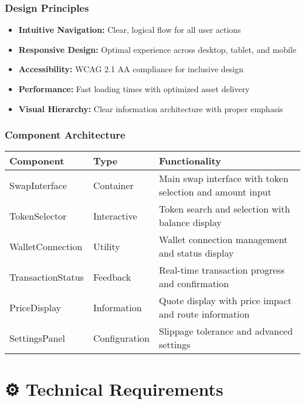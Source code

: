 \documentclass[12pt,a4paper]{article}
\begin{document}
\subsubsection{Design Principles}

\begin{itemize}
    \item \textbf{Intuitive Navigation:} Clear, logical flow for all user actions
    \item \textbf{Responsive Design:} Optimal experience across desktop, tablet, and mobile
    \item \textbf{Accessibility:} WCAG 2.1 AA compliance for inclusive design
    \item \textbf{Performance:} Fast loading times with optimized asset delivery
    \item \textbf{Visual Hierarchy:} Clear information architecture with proper emphasis
\end{itemize}

\subsubsection{Component Architecture}

\begin{longtable}{|p{4cm}|p{3cm}|p{6cm}|}
\hline
\textbf{Component} & \textbf{Type} & \textbf{Functionality} \\
\hline
\endhead

SwapInterface & Container & Main swap interface with token selection and amount input \\
\hline
TokenSelector & Interactive & Token search and selection with balance display \\
\hline
WalletConnection & Utility & Wallet connection management and status display \\
\hline
TransactionStatus & Feedback & Real-time transaction progress and confirmation \\
\hline
PriceDisplay & Information & Quote display with price impact and route information \\
\hline
SettingsPanel & Configuration & Slippage tolerance and advanced settings \\
\hline
\end{longtable}

\section{⚙️ Technical Requirements}
\end{document}
